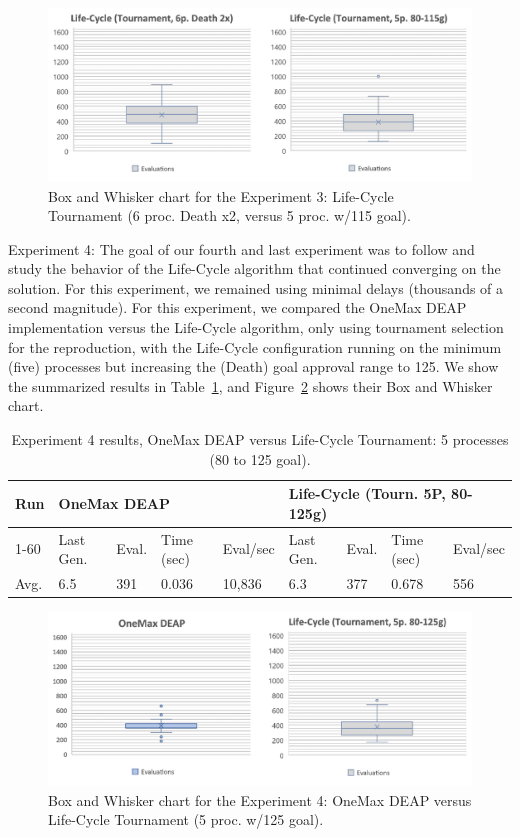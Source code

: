 \documentclass[runningheads]{llncs}
\begin{document}
\begin{figure}
    \includegraphics[width=\textwidth]{img/fig8_experiment03_chart.pdf}
    \caption{Box and Whisker chart for the Experiment 3: Life-Cycle Tournament (6 proc. Death x2, versus 5 proc. w/115 goal).} \label{fig8}
    \end{figure}


Experiment 4: The goal of our fourth and last experiment was to follow and
study the behavior of the Life-Cycle algorithm that continued converging on the
solution. For this experiment, we remained using minimal delays (thousands of a
second magnitude). For this experiment, we compared the OneMax DEAP
implementation versus the Life-Cycle algorithm, only using tournament selection
for the reproduction, with the Life-Cycle configuration running on the minimum
(five) processes but increasing the (Death) goal approval range to 125. We show
the summarized results in Table~\ref{tab5}, and Figure~\ref{fig9} shows their Box and Whisker
chart.

\begin{table}[]
    \centering        
    \caption{Experiment 4 results, OneMax DEAP versus Life-Cycle Tournament: 5 processes (80 to 125 goal).}\label{tab5}
    \begin{tabular}{|l|l|l|l|l|l|l|l|l|}
    \hline
    Run & \multicolumn{4}{l|}{OneMax DEAP} & \multicolumn{4}{l|}{Life-Cycle (Tourn. 5P, 80-125g)} \\ \hline
    1-60 & Last Gen. & Eval. & Time (sec) & Eval/sec & Last Gen. & Eval. & Time (sec) & Eval/sec \\ \hline
    Avg. & 6.5 & 391 & 0.036 & 10,836 & 6.3 & 377 & 0.678 & 556 \\ \hline
    \end{tabular}
    \end{table}

\begin{figure}
    \includegraphics[width=\textwidth]{img/fig9_experiment4_chart.pdf}
    \caption{Box and Whisker chart for the Experiment 4: OneMax DEAP versus Life-Cycle Tournament (5 proc. w/125 goal).} \label{fig9}
    \end{figure}
\end{document}

